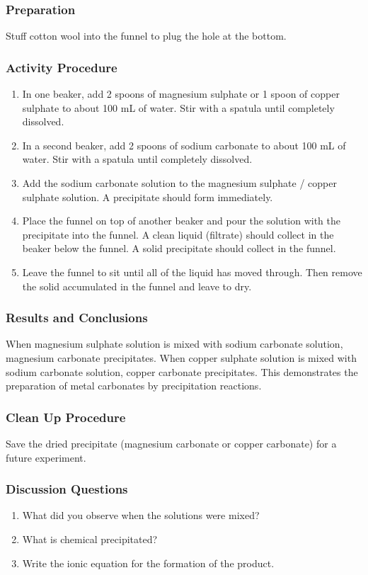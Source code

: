 \subsubsection*{Preparation}
Stuff cotton wool into the funnel to plug the hole at the bottom.

\subsubsection*{Activity Procedure}
\begin{enumerate}
\item{In one beaker, add 2 spoons of magnesium sulphate or 1 spoon of copper sulphate to about 100 mL of water. Stir with a spatula until completely dissolved.}
\item{In a second beaker, add 2 spoons of sodium carbonate to about 100 mL of water. Stir with a spatula until completely dissolved.}
\item{Add the sodium carbonate solution to the magnesium sulphate / copper sulphate solution. A precipitate should form immediately.}
\item{Place the funnel on top of another beaker and pour the solution with the precipitate into the funnel. A clean liquid (filtrate) should collect in the beaker below the funnel. A solid precipitate should collect in the funnel.}
\item{Leave the funnel to sit until all of the liquid has moved through. Then remove the solid accumulated in the funnel and leave to dry.}
\end{enumerate}

\subsubsection*{Results and Conclusions}
When magnesium sulphate solution is mixed with sodium carbonate solution, magnesium carbonate precipitates. When copper sulphate solution is mixed with sodium carbonate solution, copper carbonate precipitates. This demonstrates the preparation of metal carbonates by precipitation reactions.

\subsubsection*{Clean Up Procedure}
Save the dried precipitate (magnesium carbonate or copper carbonate) for a future experiment.

\subsubsection*{Discussion Questions}
\begin{enumerate}
\item{What did you observe when the solutions were mixed?}
\item{What is chemical precipitated?}
\item{Write the ionic equation for the formation of the product.}
\end{enumerate}

